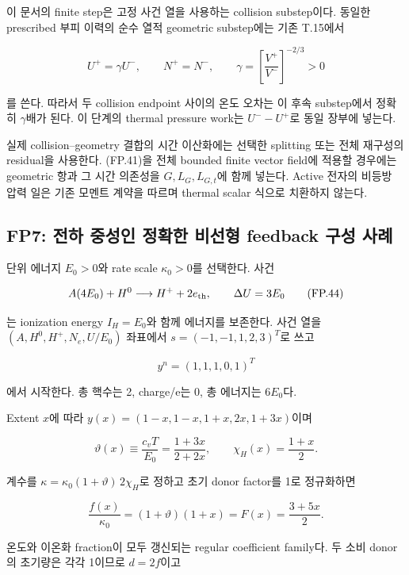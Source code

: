 \documentclass[11pt,a4paper]{article}
\begin{document}
이 문서의 finite step은 고정 사건 열을 사용하는 collision substep이다. 동일한 prescribed 부피 이력의 순수 열적 geometric substep에는 기존 T.15에서

\[
U^+=\gamma U^-,\qquad N^+=N^-,\qquad
\gamma=\left[\frac{V^+}{V^-}\right]^{-2/3}>0
\tag{FP.43}
\]

를 쓴다. 따라서 두 collision endpoint 사이의 온도 오차는 이 후속 substep에서 정확히 \(\gamma\)배가 된다. 이 단계의 thermal pressure work는 \(U^--U^+\)로 동일 장부에 넣는다.

실제 collision--geometry 결합의 시간 이산화에는 선택한 splitting 또는 전체 재구성의 residual을 사용한다. (FP.41)을 전체 bounded finite vector field에 적용할 경우에는 geometric 항과 그 시간 의존성을 \(G,L_G,L_{G,t}\)에 함께 넣는다. Active 전자의 비등방 압력 일은 기존 모멘트 계약을 따르며 thermal scalar 식으로 치환하지 않는다.

\hypertarget{fp7-uxc804uxd558-uxc911uxc131uxc778-uxc815uxd655uxd55c-uxbe44uxc120uxd615-feedback-uxad6cuxc131-uxc0acuxb840}{%
\subsection{FP7: 전하 중성인 정확한 비선형 feedback 구성 사례}\label{fp7-uxc804uxd558-uxc911uxc131uxc778-uxc815uxd655uxd55c-uxbe44uxc120uxd615-feedback-uxad6cuxc131-uxc0acuxb840}}

단위 에너지 \(E_0>0\)와 rate scale \(\kappa_0>0\)를 선택한다. 사건

\[
A(4E_0)+H^0\longrightarrow H^++2e_{\rm th},
\qquad \Delta U=3E_0
\tag{FP.44}
\]

는 ionization energy \(I_H=E_0\)와 함께 에너지를 보존한다. 사건 열을 \((A,H^0,H^+,N_e,U/E_0)\) 좌표에서 \(s=(-1,-1,1,2,3)^T\)로 쓰고

\[
y^n=(1,1,1,0,1)^T
\tag{FP.45}
\]

에서 시작한다. 총 핵수는 2, charge/e는 0, 총 에너지는 \(6E_0\)다.

Extent \(x\)에 따라 \(y(x)=(1-x,1-x,1+x,2x,1+3x)\)이며

\[
\vartheta(x)\equiv\frac{c_vT}{E_0}
=\frac{1+3x}{2+2x},\qquad
\chi_H(x)=\frac{1+x}{2}.
\tag{FP.46}
\]

계수를 \(\kappa=\kappa_0(1+\vartheta)\,2\chi_H\)로 정하고 초기 donor factor를 1로 정규화하면

\[
\frac{f(x)}{\kappa_0}
=(1+\vartheta)(1+x)
=F(x)=\frac{3+5x}{2}.
\tag{FP.47}
\]

온도와 이온화 fraction이 모두 갱신되는 regular coefficient family다. 두 소비 donor의 초기량은 각각 1이므로 \(d=2f\)이고
\end{document}
